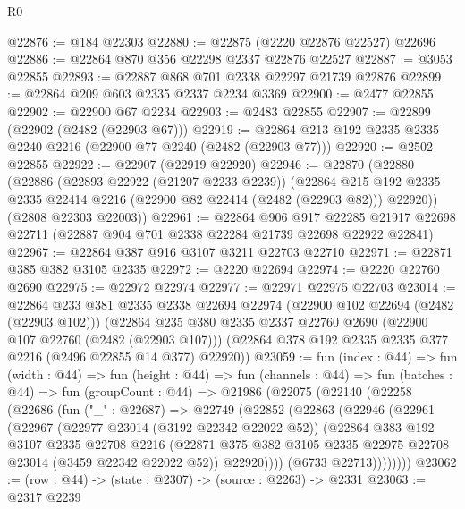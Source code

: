 \begin{lexlean}{R0}
\begin{coremodule}
@22876 := @184 @22303
@22880 := @22875 (@2220 @22876 @22527) @22696
@22886 := @22864 @870 @356 @22298 @2337 @22876 @22527
@22887 := @3053 @22855
@22893 := @22887 @868 @701 @2338 @22297 @21739 @22876
@22899 := @22864 @209 @603 @2335 @2337 @2234 @3369
@22900 := @2477 @22855
@22902 := @22900 @67 @2234
@22903 := @2483 @22855
@22907 := @22899 (@22902 (@2482 (@22903 @67)))
@22919 := @22864 @213 @192 @2335 @2335 @2240 @2216 (@22900 @77 @2240 (@2482 (@22903 @77)))
@22920 := @2502 @22855
@22922 := @22907 (@22919 @22920)
@22946 := @22870
    (@22880
      (@22886
        (@22893 @22922 (@21207 @2233 @2239))
        (@22864 @215 @192 @2335 @2335 @22414 @2216 (@22900 @82 @22414 (@2482 (@22903 @82))) @22920))
      (@2808 @22303 @22003))
@22961 := @22864
    @906
    @917
    @22285
    @21917
    @22698
    @22711
    (@22887 @904 @701 @2338 @22284 @21739 @22698 @22922 @22841)
@22967 := @22864 @387 @916 @3107 @3211 @22703 @22710
@22971 := @22871 @385 @382 @3105 @2335
@22972 := @2220 @22694
@22974 := @2220 @22760 @2690
@22975 := @22972 @22974
@22977 := @22971 @22975 @22703
@23014 := @22864
    @233
    @381
    @2335
    @2338
    @22694
    @22974
    (@22900 @102 @22694 (@2482 (@22903 @102)))
    (@22864
      @235
      @380
      @2335
      @2337
      @22760
      @2690
      (@22900 @107 @22760 (@2482 (@22903 @107)))
      (@22864 @378 @192 @2335 @2335 @377 @2216 (@2496 @22855 @14 @377) @22920))
@23059 := fun (index : @44) =>
  fun (width : @44) =>
  fun (height : @44) =>
  fun (channels : @44) =>
  fun (batches : @44) =>
  fun (groupCount : @44) =>
  @21986
    (@22075
      (@22140
        (@22258
          (@22686
            (fun ("_" : @22687) =>
            @22749
              (@22852
                (@22863
                  (@22946
                    (@22961
                      (@22967
                        (@22977 @23014 (@3192 @22342 @22022 @52))
                        (@22864
                          @383
                          @192
                          @3107
                          @2335
                          @22708
                          @2216
                          (@22871
                            @375
                            @382
                            @3105
                            @2335
                            @22975
                            @22708
                            @23014
                            (@3459 @22342 @22022 @52))
                          @22920))))
                  (@6733 @22713))))))))
@23062 := (row : @44) -> (state : @2307) -> (source : @2263) -> @2331
@23063 := @2317 @2239

\end{coremodule}
\end{lexlean}
